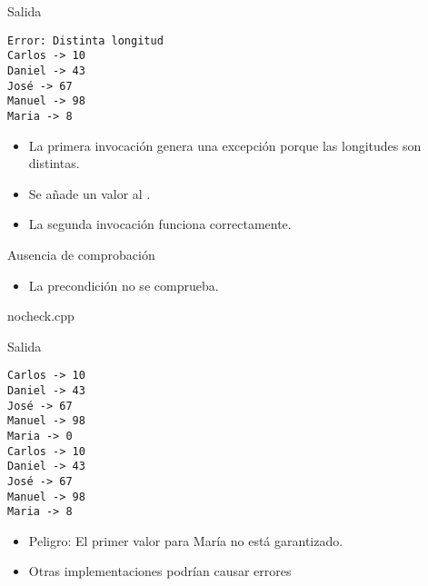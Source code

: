 
\begin{frame}[t,fragile]{Salida}
\begin{lstlisting}[style=terminal]
Error: Distinta longitud
Carlos -> 10
Daniel -> 43
José -> 67
Manuel -> 98
Maria -> 8
\end{lstlisting}
\begin{itemize}
  \item La primera invocación genera una excepción porque las longitudes son distintas.
  \item Se añade un valor al .
  \item La segunda invocación funciona correctamente.
\end{itemize}
\end{frame}


\begin{frame}{Ausencia de comprobación}
\begin{itemize}
  \item La precondición no se comprueba.
\end{itemize}
\pause
\begin{block}{nocheck.cpp}
\end{block}
\end{frame}


\begin{frame}[fragile]{Salida}
\begin{lstlisting}[style=terminal]
Carlos -> 10
Daniel -> 43
José -> 67
Manuel -> 98
Maria -> 0
Carlos -> 10
Daniel -> 43
José -> 67
Manuel -> 98
Maria -> 8
\end{lstlisting}
\begin{itemize}
  \item \alert{Peligro}: El primer valor para María no está garantizado.
  \item Otras implementaciones podrían causar errores
\end{itemize}
\end{frame}

